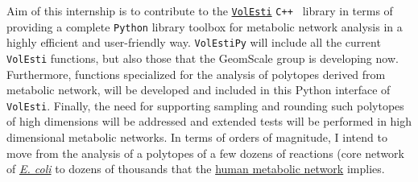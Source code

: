 \documentclass[a4paper, 12pt]{article}
\begin{document}
Aim of this internship is to contribute to the \textcolor{blue}{\href{https://github.com/GeomScale/volume_approximation}{{\tt VolEsti}}} \texttt{C++ } library in terms of providing a complete \texttt{Python} library toolbox for metabolic network analysis in a highly efficient and user-friendly way. \texttt{VolEstiPy} will include all the current \texttt{VolEsti} functions, but also those that the GeomScale group is developing now. Furthermore, functions specialized for the analysis of polytopes derived from metabolic network, will be developed and included in this Python interface of \texttt{VolEsti}. Finally, the need for supporting sampling and rounding such polytopes of high dimensions will be addressed and extended tests will be performed in high dimensional metabolic networks. In terms of orders of magnitude, I intend to move from the analysis of a polytopes of a few dozens of reactions (core network of \textcolor{blue}{\href{http://bigg.ucsd.edu/models/e_coli_core}{\textit{E. coli}}} to dozens of thousands that the \textcolor{blue}{\href{http://bigg.ucsd.edu/models/Recon3D}{human metabolic network}} implies. 






\end{document}
